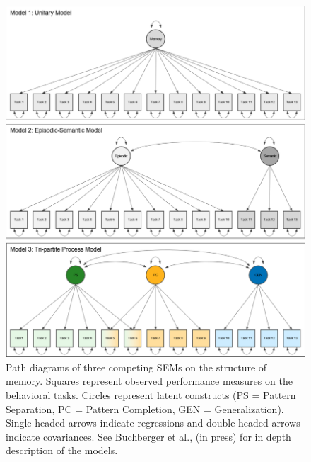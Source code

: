 \documentclass[
  man,floatsintext]{apa6}
\begin{document}
\begin{figure}

{\centering \includegraphics[width=1\linewidth]{Images/Figure1} 

}

\caption{Path diagrams of three competing SEMs on the structure of memory. Squares represent observed performance measures on the behavioral tasks. Circles represent latent constructs (PS = Pattern Separation, PC = Pattern Completion, GEN = Generalization). Single-headed arrows indicate regressions and double-headed arrows indicate covariances. See Buchberger et al., (in press) for in depth description of the models.}\label{fig:Figure1}
\end{figure}
\end{document}
